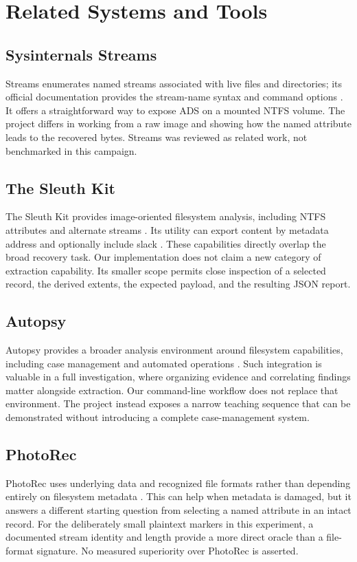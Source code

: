 \section{Related Systems and Tools}
\subsection{Sysinternals Streams}
Streams enumerates named streams associated with live files and directories;
its official documentation provides the stream-name syntax and command
options \cite{sysstreams}. It offers a straightforward way to expose ADS
on a mounted NTFS volume. The project differs in working from a raw image
and showing how the named attribute leads to the recovered bytes. Streams
was reviewed as related work, not benchmarked in this campaign.

\subsection{The Sleuth Kit}
The Sleuth Kit provides image-oriented filesystem analysis, including NTFS
attributes and alternate streams \cite{tsk}. Its  utility can
export content by metadata address and optionally include slack
\cite{icat}. These capabilities directly overlap the broad recovery task.
Our implementation does not claim a new category of extraction capability.
Its smaller scope permits close inspection of a selected record, the
derived extents, the expected payload, and the resulting JSON report.

\subsection{Autopsy}
Autopsy provides a broader analysis environment around filesystem
capabilities, including case management and automated operations
\cite{tsk}. Such integration is valuable in a full investigation, where
organizing evidence and correlating findings matter alongside extraction.
Our command-line workflow does not replace that environment. The project
instead exposes a narrow teaching sequence that can be demonstrated without
introducing a complete case-management system.

\subsection{PhotoRec}
PhotoRec uses underlying data and recognized file formats rather than
depending entirely on filesystem metadata \cite{photorec}. This can help
when metadata is damaged, but it answers a different starting question
from selecting a named attribute in an intact record. For the deliberately
small plaintext markers in this experiment, a documented stream identity
and length provide a more direct oracle than a file-format signature.
No measured superiority over PhotoRec is asserted.

